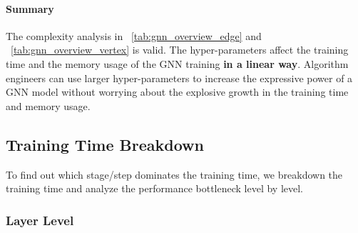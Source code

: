 \paragraph{Summary}

The complexity analysis in \tablename~\ref{tab:gnn_overview_edge} and \tablename~\ref{tab:gnn_overview_vertex} is valid.
The hyper-parameters affect the training time and the memory usage of the GNN training \textbf{in a linear way}.
Algorithm engineers can use larger hyper-parameters to increase the expressive power of a GNN model without worrying about the explosive growth in the training time and memory usage.

\subsection{Training Time Breakdown}
\label{sec:training_time_breakdown}

To find out which stage/step dominates the training time, we breakdown the training time and analyze the performance bottleneck level by level.

\subsubsection{Layer Level}

